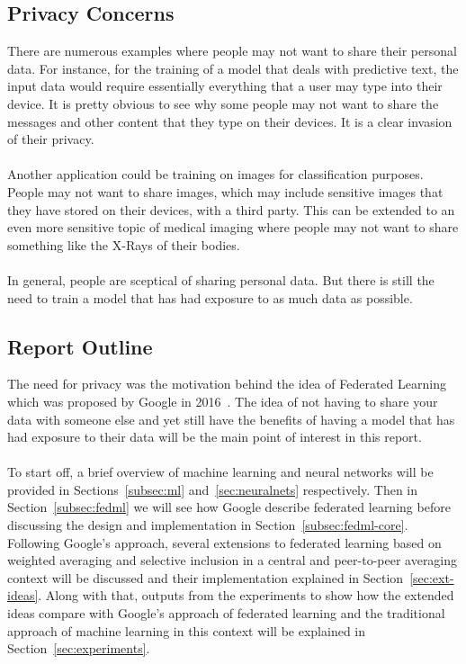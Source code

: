 \documentclass[12pt]{article}
\begin{document}
\subsection{Privacy Concerns}
There are numerous examples where people may not want to share their personal data. For instance, for the training of a model that deals with predictive text, the input data would require essentially everything that a user may type into their device. It is pretty obvious to see why some people may not want to share the messages and other content that they type on their devices. It is a clear invasion of their privacy.
\\\\
Another application could be training on images for classification purposes. People may not want to share images, which may include sensitive images that they have stored on their devices, with a third party. This can be extended to an even more sensitive topic of medical imaging where people may not want to share something like the X-Rays of their bodies.
\\\\
In general, people are sceptical of sharing personal data. But there is still the need to train a model that has had exposure to as much data as possible. 
\subsection{Report Outline}
The need for privacy was the motivation behind the idea of Federated Learning which was proposed by Google in 2016~\cite{mcmahan2016communication}. The idea of not having to share your data with someone else and yet still have the benefits of having a model that has had exposure to their data will be the main point of interest in this report. 
\\\\
To start off, a brief overview of machine learning and neural networks will be provided in Sections~\ref{subsec:ml} and~\ref{sec:neuralnets} respectively. Then in Section~\ref{subsec:fedml} we will see how Google describe federated learning before discussing the design and implementation in Section~\ref{subsec:fedml-core}. Following Google's approach, several extensions to federated learning based on weighted averaging and selective inclusion in a central and peer-to-peer averaging context will be discussed and their implementation explained in Section~\ref{sec:ext-ideas}. Along with that, outputs from the experiments to show how the extended ideas compare with Google's approach of federated learning and the traditional approach of machine learning in this context will be explained in Section~\ref{sec:experiments}. 
\end{document}
